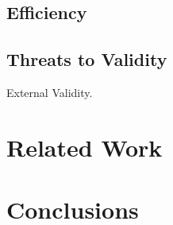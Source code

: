\documentclass[sigconf,review, anonymous]{acmart}
\begin{document}
\subsection{Efficiency}

\subsection{Threats to Validity}

External Validity. 

\section{Related Work}


\section{Conclusions}






\end{document}
